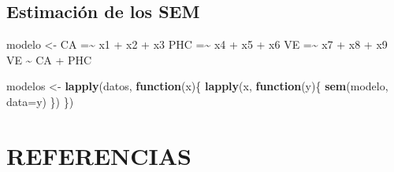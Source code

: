 \documentclass[
]{article}
\newenvironment{Shaded}{\begin{snugshade}}{\end{snugshade}}
\newcommand{\ControlFlowTok}[1]{\textcolor[rgb]{0.13,0.29,0.53}{\textbf{#1}}}
\newcommand{\DataTypeTok}[1]{\textcolor[rgb]{0.13,0.29,0.53}{#1}}
\newcommand{\KeywordTok}[1]{\textcolor[rgb]{0.13,0.29,0.53}{\textbf{#1}}}
\newcommand{\NormalTok}[1]{#1}
\newcommand{\StringTok}[1]{\textcolor[rgb]{0.31,0.60,0.02}{#1}}
\begin{document}
\subsection{Estimación de los SEM}

\label{modelos_sem}

\begin{Shaded}
\begin{Highlighting}[]
\NormalTok{modelo \textless{}{-}}\StringTok{ \textquotesingle{} CA =\textasciitilde{} x1 + x2 + x3}
\StringTok{            PHC =\textasciitilde{} x4 + x5 + x6}
\StringTok{            VE =\textasciitilde{} x7 + x8 + x9}
\StringTok{            VE \textasciitilde{} CA + PHC \textquotesingle{}}

\NormalTok{modelos \textless{}{-}}\StringTok{ }\KeywordTok{lapply}\NormalTok{(datos, }\ControlFlowTok{function}\NormalTok{(x)\{}
  \KeywordTok{lapply}\NormalTok{(x, }\ControlFlowTok{function}\NormalTok{(y)\{}
    \KeywordTok{sem}\NormalTok{(modelo, }\DataTypeTok{data=}\NormalTok{y)}
\NormalTok{  \})}
\NormalTok{\})}
\end{Highlighting}
\end{Shaded}

\section{REFERENCIAS}
\end{document}
